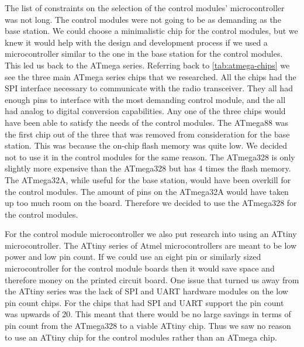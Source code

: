 The list of constraints on the selection of the control modules{}'
microcontroller was not long. The control modules were not going to be as
demanding as the base station. We could choose a minimalistic chip for the
control modules, but we knew it would help with the design and development
process if we used a microcontroller similar to the one in the base station for
the control modules. This led us back to the ATmega series. Referring back to
\autoref{tab:atmega-chips} we see the three main ATmega series chips that we
researched. All the chips had the SPI interface necessary to communicate with
the radio transceiver. They all had enough pins to interface with the most
demanding control module, and the all had analog to digital conversion
capabilities. Any one of the three chips would have been able to satisfy the
needs of the control modules. The ATmega88 was the first chip out of the three
that was removed from consideration for the base station. This was because the
on{}-chip flash memory was quite low. We decided not to use it in the control
modules for the same reason. The ATmega328 is only slightly more expensive than
the ATmega328 but has 4 times the flash memory. The ATmega32A, while useful for
the base station, would have been overkill for the control modules.  The amount
of pins on the ATmega32A would have taken up too much room on the board.
Therefore we decided to use the ATmega328 for the control modules.

For the control module microcontroller we also put research into using an
ATtiny microcontroller. The ATtiny series of Atmel microcontrollers are meant
to be low power and low pin count. If we could use an eight pin or similarly
sized microcontroller for the control module boards then it would save space
and therefore money on the printed circuit board. One issue that turned us away
from the ATtiny series was the lack of SPI and UART hardware modules on the low
pin count chips. For the chips that had SPI and UART support the pin count was
upwards of 20. This meant that there would be no large savings in terms of pin
count from the ATmega328 to a viable ATtiny chip. Thus we saw no reason to use
an ATtiny chip for the control modules rather than an ATmega chip.

